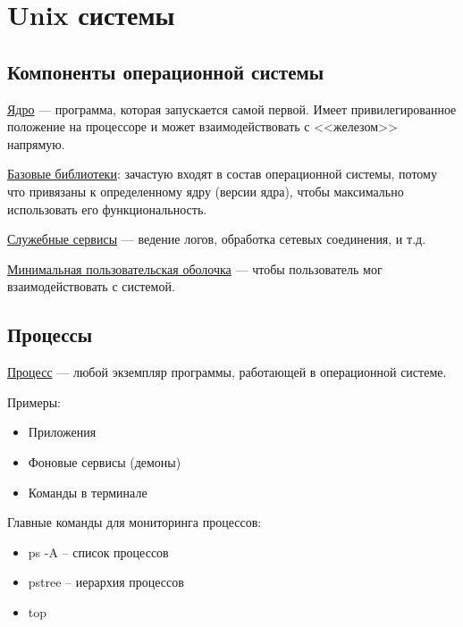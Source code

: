 \section{Unix системы}

\subsection{Компоненты операционной системы}

\begin{Def}
	\underline{Ядро} --- программа, которая запускается самой первой. Имеет привилегированное положение на процессоре и может взаимодействовать с <<железом>> напрямую.
\end{Def}

\begin{Def}
	\underline{Базовые библиотеки}: зачастую входят в состав операционной системы, потому что привязаны к определенному ядру (версии ядра), чтобы максимально использовать его функциональность. 
\end{Def}

\begin{Def}
\underline{Служебные сервисы} --- ведение логов, обработка сетевых соединения, и т.д.
\end{Def}

\begin{Def}
\underline{Минимальная пользовательская оболочка} --- чтобы пользователь мог взаимодействовать с системой.
\end{Def}

\subsection{Процессы}

\begin{Def}
\underline{Процесс} --- любой экземпляр программы, работающей в операционной системе.
\end{Def}

Примеры:
\begin{itemize}
	\item Приложения
	\item Фоновые сервисы (демоны)
	\item Команды в терминале
\end{itemize}

Главные команды для мониторинга процессов:
\begin{itemize}
	\item ps -A -- список процессов
	\item pstree -- иерархия процессов
	\item top
\end{itemize}

